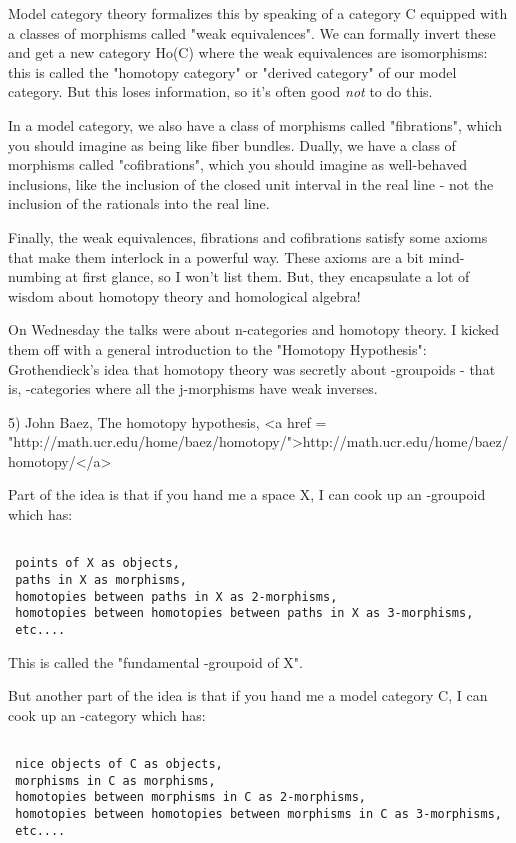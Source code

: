 Model category theory formalizes this by speaking of a category C
equipped with a classes of morphisms called "weak
equivalences".  We can formally invert these and get a new
category Ho(C) where the weak equivalences are isomorphisms: this is
called the "homotopy category" or "derived
category" of our model category.  But this loses information, so
it's often good \emph{not} to do this.

In a model category, we also have a class of morphisms called
"fibrations", which you should imagine as being like fiber
bundles.  Dually, we have a class of morphisms called
"cofibrations", which you should imagine as well-behaved
inclusions, like the inclusion of the closed unit interval in the real
line - not the inclusion of the rationals into the real line.

Finally, the weak equivalences, fibrations and cofibrations 
satisfy some axioms that make them interlock in a powerful way.
These axioms are a bit mind-numbing at first glance, so I won't
list them.  But, they encapsulate a lot of wisdom about homotopy
theory and homological algebra!  

On Wednesday the talks were about n-categories and homotopy theory.  I
kicked them off with a general introduction to the "Homotopy
Hypothesis": Grothendieck's idea that homotopy theory was
secretly about \infty -groupoids - that is, \infty -categories where
all the j-morphisms have weak inverses.

5) John Baez, The homotopy hypothesis, 
<a href = "http://math.ucr.edu/home/baez/homotopy/">http://math.ucr.edu/home/baez/homotopy/</a>

Part of the idea is that if you hand me a space X, I can cook up 
an \infty -groupoid which has:


\begin{verbatim}

 points of X as objects,
 paths in X as morphisms,
 homotopies between paths in X as 2-morphisms,
 homotopies between homotopies between paths in X as 3-morphisms,
 etc....
\end{verbatim}
    

This is called the "fundamental \infty -groupoid of X".

But another part of the idea is that if you hand me a model 
category C, I can cook up an \infty -category which has:


\begin{verbatim}

 nice objects of C as objects,
 morphisms in C as morphisms,
 homotopies between morphisms in C as 2-morphisms,
 homotopies between homotopies between morphisms in C as 3-morphisms,
 etc....
\end{verbatim}
    
